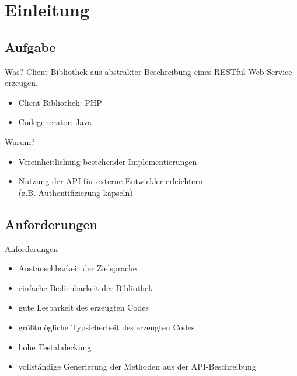 \section{Einleitung}

\subsection{Aufgabe}
\begin{frame}[squeeze]
    \begin{block}{Was?}
        Client-Bibliothek aus abstrakter Beschreibung eines RESTful Web Service erzeugen.
        \begin{itemize}
            \item Client-Bibliothek: PHP
            \item Codegenerator: Java
        \end{itemize}
    \end{block}

    \begin{block}{Warum?}
        \begin{itemize}
            \item Vereinheitlichung bestehender Implementierungen
            \item Nutzung der API für externe Entwickler erleichtern\\(z.B. Authentifizierung kapseln)
        \end{itemize}
    \end{block}
\end{frame}

\subsection{Anforderungen}
\begin{frame}{Anforderungen}
    \begin{itemize}
        \item Austauschbarkeit der Zielsprache
        \item einfache Bedienbarkeit der Bibliothek
        \item gute Lesbarkeit des erzeugten Codes
        \item größtmögliche Typsicherheit des erzeugten Codes
        \item {\color{gray} hohe Testabdeckung}
        \item vollständige Generierung der Methoden aus der API-Beschreibung
    \end{itemize}
\end{frame}

